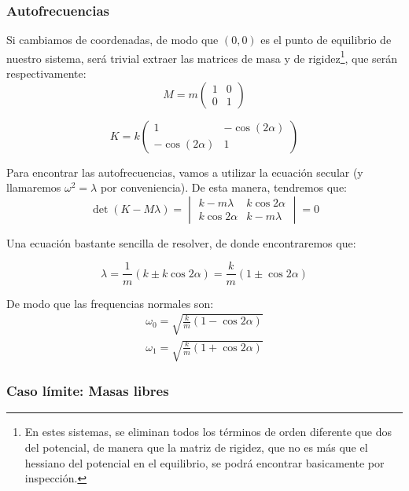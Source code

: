 \documentclass[a4paper,12pt]{article}
\begin{document}
\subsubsection*{Autofrecuencias}
Si cambiamos de coordenadas, de modo que $(0,0)$ es el punto de equilibrio de nuestro sistema, será trivial extraer las matrices de masa y de rigidez\footnote{En estes sistemas, se eliminan todos los términos de orden diferente que dos del potencial, de manera que la matriz de rigidez, que no es más que el hessiano del potencial en el equilibrio, se podrá encontrar basicamente por inspección.}, que serán respectivamente: 
\begin{equation}
  M = m\begin{pmatrix}
    1&0\\0&1
  \end{pmatrix}
\end{equation}

\begin{equation}
  K = k\begin{pmatrix}
    1&-\cos{(2\alpha)}\\-\cos{(2\alpha)}&1
  \end{pmatrix}
\end{equation}

Para encontrar las autofrecuencias, vamos a utilizar la ecuación secular (y llamaremos $\omega^2 = \lambda$ por conveniencia). De esta manera, tendremos que:
\begin{equation}
\det\left(K - M \lambda\right) = \begin{vmatrix}
  k-m\lambda & k\cos{2\alpha}\\ k\cos{2\alpha}&k-m\lambda
\end{vmatrix}=0
\end{equation}

Una ecuación bastante sencilla de resolver, de donde encontraremos que:

$$\lambda = \frac{1}{m} (k \pm k\cos{2\alpha}) = \frac{k}{m} (1\pm \cos{2\alpha})$$

De modo que las frequencias normales son:
\begin{equation}
  \begin{aligned}
  \omega_0 = \sqrt{ \frac{k}{m} (1 - \cos{2\alpha})}\\
  \omega_1 = \sqrt{ \frac{k}{m} (1 + \cos{2\alpha})}
  \end{aligned}
\end{equation}
\subsubsection*{Caso límite: Masas libres}
\end{document}
